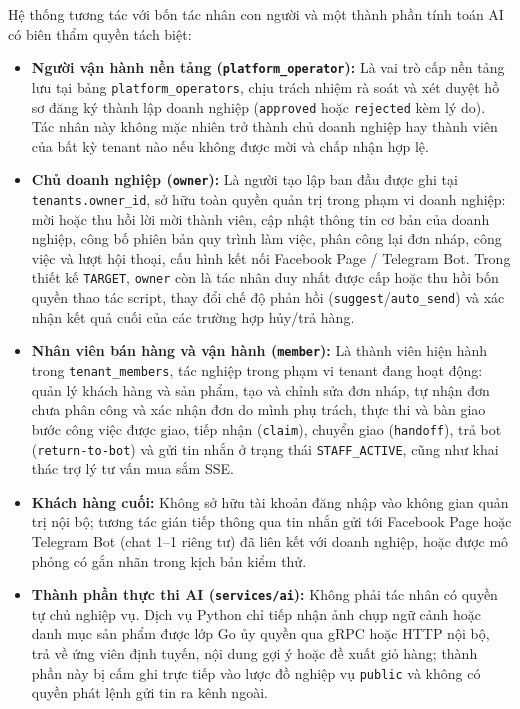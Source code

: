 Hệ thống tương tác với bốn tác nhân con người và một thành phần tính toán AI có biên thẩm quyền tách biệt:
\begin{itemize}
  \item \textbf{Người vận hành nền tảng (\texttt{platform\_\hspace{0pt}operator}):} Là vai trò cấp nền tảng lưu tại bảng \texttt{platform\_\hspace{0pt}operators}, chịu trách nhiệm rà soát và xét duyệt hồ sơ đăng ký thành lập doanh nghiệp (\texttt{approved} hoặc \texttt{rejected} kèm lý do).
    Tác nhân này không mặc nhiên trở thành chủ doanh nghiệp hay thành viên của bất kỳ tenant nào nếu không được mời và chấp nhận hợp lệ.
  \item \textbf{Chủ doanh nghiệp (\texttt{owner}):} Là người tạo lập ban đầu được ghi tại \texttt{tenants.\hspace{0pt}owner\_\hspace{0pt}id}, sở hữu toàn quyền quản trị trong phạm vi doanh nghiệp: mời hoặc thu hồi lời mời thành viên, cập nhật thông tin cơ bản của doanh nghiệp, công bố phiên bản quy trình làm việc, phân công lại đơn nháp, công việc và lượt hội thoại, cấu hình kết nối Facebook Page / Telegram Bot.
    Trong thiết kế \texttt{TARGET}, \texttt{owner} còn là tác nhân duy nhất được cấp hoặc thu hồi bốn quyền thao tác script, thay đổi chế độ phản hồi (\texttt{suggest}/\texttt{auto\_\hspace{0pt}send}) và xác nhận kết quả cuối của các trường hợp hủy/trả hàng.
  \item \textbf{Nhân viên bán hàng và vận hành (\texttt{member}):} Là thành viên hiện hành trong \texttt{tenant\_\hspace{0pt}members}, tác nghiệp trong phạm vi tenant đang hoạt động: quản lý khách hàng và sản phẩm, tạo và chỉnh sửa đơn nháp, tự nhận đơn chưa phân công và xác nhận đơn do mình phụ trách, thực thi và bàn giao bước công việc được giao, tiếp nhận (\texttt{claim}), chuyển giao (\texttt{handoff}), trả bot (\texttt{return-\hspace{0pt}to-\hspace{0pt}bot}) và gửi tin nhắn ở trạng thái \texttt{STAFF\_\hspace{0pt}ACTIVE}, cũng như khai thác trợ lý tư vấn mua sắm SSE.
  \item \textbf{Khách hàng cuối:} Không sở hữu tài khoản đăng nhập vào không gian quản trị nội bộ; tương tác gián tiếp thông qua tin nhắn gửi tới Facebook Page hoặc Telegram Bot (chat 1--1 riêng tư) đã liên kết với doanh nghiệp, hoặc được mô phỏng có gắn nhãn trong kịch bản kiểm thử.
  \item \textbf{Thành phần thực thi AI (\texttt{services/\hspace{0pt}ai}):} Không phải tác nhân có quyền tự chủ nghiệp vụ.
    Dịch vụ Python chỉ tiếp nhận ảnh chụp ngữ cảnh hoặc danh mục sản phẩm được lớp Go ủy quyền qua gRPC hoặc HTTP nội bộ, trả về ứng viên định tuyến, nội dung gợi ý hoặc đề xuất giỏ hàng; thành phần này bị cấm ghi trực tiếp vào lược đồ nghiệp vụ \texttt{public} và không có quyền phát lệnh gửi tin ra kênh ngoài.
\end{itemize}

